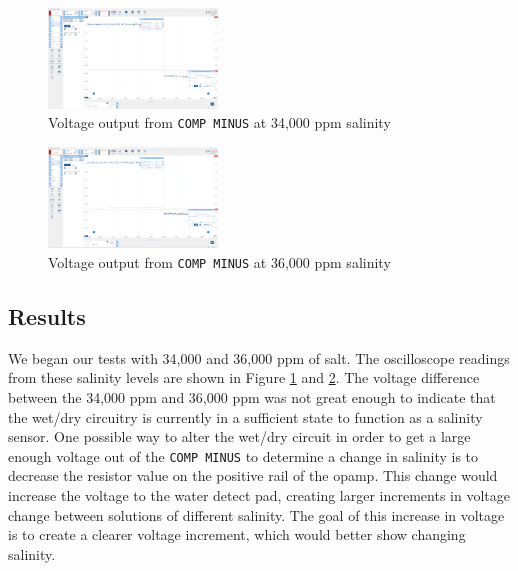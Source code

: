 \documentclass[twocolumn]{article}
\begin{document}
\begin{figure}
    \centering
    \includegraphics[width=0.4\textwidth]{34,000ppmsalinity.png}
    \caption{Voltage output from \lstinline{COMP MINUS} at 34,000 ppm salinity}
    \label{fig:salinity_34000}
\end{figure}

\begin{figure}
    \centering
    \includegraphics[width=0.4\textwidth]{36,000ppmsalinity.png}
    \caption{Voltage output from \lstinline{COMP MINUS} at 36,000 ppm salinity}
    \label{fig:salinity_36000}
\end{figure}

\subsection{Results}
We began our tests with 34,000 and 36,000 ppm of salt. The oscilloscope readings from these salinity levels are shown in Figure \ref{fig:salinity_34000} and \ref{fig:salinity_36000}. The voltage difference between the 34,000 ppm and 36,000 ppm was not great enough to indicate that the wet/dry circuitry is currently in a sufficient state to function as a salinity sensor. One possible way to alter the wet/dry circuit in order to get a large enough voltage out of the \lstinline{COMP MINUS} to determine a change in salinity is to decrease the resistor value on the positive rail of the opamp. This change would increase the voltage to the water detect pad, creating larger increments in voltage change between solutions of different salinity. The goal of this increase in voltage is to create a clearer voltage increment, which would better show changing salinity.
\end{document}
